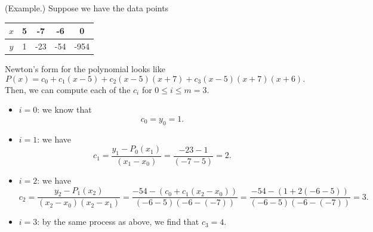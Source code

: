 \documentclass[letterpaper]{article}
\begin{document}
\begin{mdframed}
    (Example.) Suppose we have the data points 
    \begin{center}
        \begin{tabular}{c|c c c c}
            $x$ & 5 & -7 & -6 & 0 \\ 
            \hline 
            $y$ & 1 & -23 & -54 & -954 
        \end{tabular}
    \end{center}
    Newton's form for the polynomial looks like 
    \[P(x) = c_0 + c_1 (x - 5) + c_2 (x - 5)(x + 7) + c_3 (x - 5)(x + 7)(x + 6).\]
    Then, we can compute each of the $c_i$ for $0 \leq i \leq m = 3$. 
    \begin{itemize}
        \item $i = 0$: we know that 
        \[c_0 = y_0 = 1.\]

        \item $i = 1$: we have 
        \[c_1 = \frac{y_1 - P_{0}(x_1)}{(x_1 - x_0)} = \frac{-23 - 1}{(-7 - 5)} = 2.\]

        \item $i = 2$: we have
        \[c_2 = \frac{y_2 - P_{1}(x_2)}{(x_2 - x_0) (x_2 - x_1)} = \frac{-54 - (c_0 + c_1 (x_2 - x_0))}{(-6 - 5)(-6 - (-7))} = \frac{-54 - (1 + 2(-6 - 5))}{(-6 - 5)(-6 - (-7))} = 3.\]

        \item $i = 3$: by the same process as above, we find that $c_3 = 4$.
    \end{itemize}
\end{mdframed}
\end{document}
